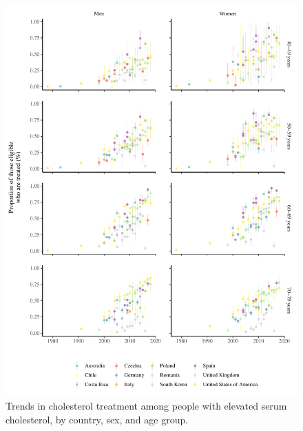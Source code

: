 \documentclass[12pt]{article}
\begin{document}
\begin{figure}[hp]
    \centering
    \includegraphics[width=\textwidth]{../3_figures/fig3_treated.pdf}
    \caption{Trends in cholesterol treatment among people with elevated serum cholesterol, by country, sex, and age group.}
    \label{fig:treated}
\end{figure}
\end{document}
